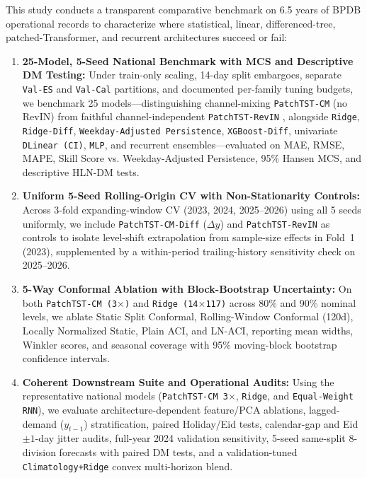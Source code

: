 \documentclass[5p,twocolumn,authoryear]{elsarticle}
\begin{document}
This study conducts a transparent comparative benchmark on 6.5 years of BPDB operational records to characterize where statistical, linear, differenced-tree, patched-Transformer, and recurrent architectures succeed or fail:
\begin{enumerate}
    \item \textbf{25-Model, 5-Seed National Benchmark with MCS and Descriptive DM Testing:} Under train-only scaling, 14-day split embargoes, separate \texttt{Val-ES} and \texttt{Val-Cal} partitions, and documented per-family tuning budgets, we benchmark 25 models---distinguishing channel-mixing \texttt{PatchTST-CM} (no RevIN) from faithful channel-independent \texttt{PatchTST-RevIN} \citep{nie2023patchtst,kim2022revin}, alongside \texttt{Ridge}, \texttt{Ridge-Diff}, \texttt{Weekday-Adjusted Persistence}, \texttt{XGBoost-Diff}, univariate \texttt{DLinear (CI)}, \texttt{MLP}, and recurrent ensembles---evaluated on MAE, RMSE, MAPE, Skill Score vs. Weekday-Adjusted Persistence, 95\% Hansen MCS, and descriptive HLN-DM tests.
    \item \textbf{Uniform 5-Seed Rolling-Origin CV with Non-Stationarity Controls:} Across 3-fold expanding-window CV (2023, 2024, 2025--2026) using all 5 seeds uniformly, we include \texttt{PatchTST-CM-Diff} ($\Delta y$) and \texttt{PatchTST-RevIN} as controls to isolate level-shift extrapolation from sample-size effects in Fold~1 (2023), supplemented by a within-period trailing-history sensitivity check on 2025--2026.
    \item \textbf{5-Way Conformal Ablation with Block-Bootstrap Uncertainty:} On both \texttt{PatchTST-CM (3$\times$)} and \texttt{Ridge (14$\times$117)} across 80\% and 90\% nominal levels, we ablate Static Split Conformal, Rolling-Window Conformal (120d), Locally Normalized Static, Plain ACI, and LN-ACI, reporting mean widths, Winkler scores, and seasonal coverage with 95\% moving-block bootstrap confidence intervals.
    \item \textbf{Coherent Downstream Suite and Operational Audits:} Using the representative national models (\texttt{PatchTST-CM 3$\times$}, \texttt{Ridge}, and \texttt{Equal-Weight RNN}), we evaluate architecture-dependent feature/PCA ablations, lagged-demand ($y_{t-1}$) stratification, paired Holiday/Eid tests, calendar-gap and Eid $\pm 1$-day jitter audits, full-year 2024 validation sensitivity, 5-seed same-split 8-division forecasts with paired DM tests, and a validation-tuned \texttt{Climatology+Ridge} convex multi-horizon blend.
\end{enumerate}
\end{document}
